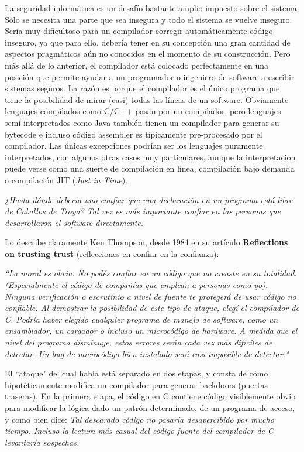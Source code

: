 La seguridad informática es un desafío bastante amplio impuesto sobre el sistema. Sólo se necesita una parte que sea insegura y todo el sistema se vuelve inseguro. Sería muy dificultoso para un compilador corregir automáticamente código inseguro, ya que para ello, debería tener en su concepción una gran cantidad de aspectos pragmáticos aún no conocidos en el momento de su construcción. Pero más allá de lo anterior, el compilador está colocado perfectamente en una posición que permite ayudar a un programador o ingeniero de software a escribir sistemas seguros. La razón es porque el compilador es el único programa que tiene la posibilidad de mirar (casi) todas las líneas de un software. Obviamente lenguajes compilados como C/C++ pasan por un compilador, pero lenguajes semi-interpretados como Java también tienen un compilador para generar su bytecode e incluso código assembler es típicamente pre-procesado por el compilador. Las únicas excepciones podrían ser los lenguajes puramente interpretados, con algunos otras casos muy particulares\cite{secenhancedcompilers}, aunque la interpretación puede verse como una suerte de compilación en línea, compilación bajo demanda o compilación JIT (\textit{Just in Time})\cite{bolc2012design}\cite{mak2011writing}.

\textit{¿Hasta dónde debería uno confiar que una declaración en un programa está libre de Caballos de Troya? Tal vez es más importante confiar en las personas que desarrollaron el software directamente.}

Lo describe claramente Ken Thompson, desde 1984 en su artículo \textbf{Reflections on trusting trust} (reflecciones en confiar en la confianza):
\begin{displayquote}
    \textit{``La moral es obvia. No podés confiar en un código que no creaste en su totalidad. (Especialmente el código de compañías que emplean a personas como yo). Ninguna verificación o escrutinio a nivel de fuente te protegerá de usar código no confiable. Al demostrar la posibilidad de este tipo de ataque, elegí el compilador de C. Podría haber elegido cualquier programa de manejo de software, como un ensamblador, un cargador o incluso un microcódigo de hardware. A medida que el nivel del programa disminuye, estos errores serán cada vez más difíciles de detectar. Un bug de microcódigo bien instalado será casi imposible de detectar."}
\end{displayquote}

El ``ataque" del cual habla está separado en dos etapas, y consta de cómo hipotéticamente modifica un compilador para generar backdoors (puertas traseras). En la primera etapa, el código en C contiene código visiblemente obvio para modificar la lógica dado un patrón determinado, de un programa de acceso, y como bien dice:
\textit{Tal descarado código no pasaría desapercibido por mucho tiempo. Incluso la lectura más casual del código fuente del compilador de C levantaría sospechas.}

